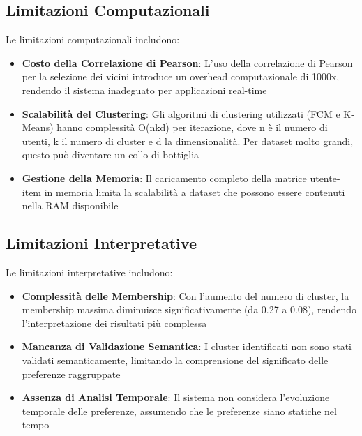 \subsection{Limitazioni Computazionali}

Le limitazioni computazionali includono:

\begin{itemize}
    \item \textbf{Costo della Correlazione di Pearson}: L'uso della correlazione di Pearson per la selezione dei vicini introduce un overhead computazionale di 1000x, rendendo il sistema inadeguato per applicazioni real-time
    
    \item \textbf{Scalabilità del Clustering}: Gli algoritmi di clustering utilizzati (FCM e K-Means) hanno complessità O(nkd) per iterazione, dove n è il numero di utenti, k il numero di cluster e d la dimensionalità. Per dataset molto grandi, questo può diventare un collo di bottiglia
    
    \item \textbf{Gestione della Memoria}: Il caricamento completo della matrice utente-item in memoria limita la scalabilità a dataset che possono essere contenuti nella RAM disponibile
\end{itemize}

\subsection{Limitazioni Interpretative}

Le limitazioni interpretative includono:

\begin{itemize}
    \item \textbf{Complessità delle Membership}: Con l'aumento del numero di cluster, la membership massima diminuisce significativamente (da 0.27 a 0.08), rendendo l'interpretazione dei risultati più complessa
    
    \item \textbf{Mancanza di Validazione Semantica}: I cluster identificati non sono stati validati semanticamente, limitando la comprensione del significato delle preferenze raggruppate
    
    \item \textbf{Assenza di Analisi Temporale}: Il sistema non considera l'evoluzione temporale delle preferenze, assumendo che le preferenze siano statiche nel tempo
\end{itemize}

